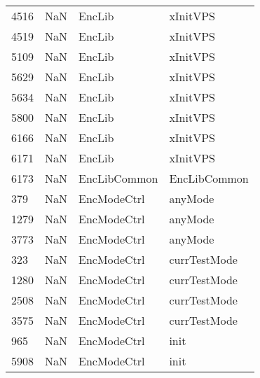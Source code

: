 \begin{tabular}{llll}
4516 &                   NaN &                     EncLib &                                  xInitVPS \\
4519 &                   NaN &                     EncLib &                                  xInitVPS \\
5109 &                   NaN &                     EncLib &                                  xInitVPS \\
5629 &                   NaN &                     EncLib &                                  xInitVPS \\
5634 &                   NaN &                     EncLib &                                  xInitVPS \\
5800 &                   NaN &                     EncLib &                                  xInitVPS \\
6166 &                   NaN &                     EncLib &                                  xInitVPS \\
6171 &                   NaN &                     EncLib &                                  xInitVPS \\
6173 &                   NaN &               EncLibCommon &                              EncLibCommon \\
379  &                   NaN &                EncModeCtrl &                                   anyMode \\
1279 &                   NaN &                EncModeCtrl &                                   anyMode \\
3773 &                   NaN &                EncModeCtrl &                                   anyMode \\
323  &                   NaN &                EncModeCtrl &                              currTestMode \\
1280 &                   NaN &                EncModeCtrl &                              currTestMode \\
2508 &                   NaN &                EncModeCtrl &                              currTestMode \\
3575 &                   NaN &                EncModeCtrl &                              currTestMode \\
965  &                   NaN &                EncModeCtrl &                                      init \\
5908 &                   NaN &                EncModeCtrl &                                      init \\

\end{tabular}
